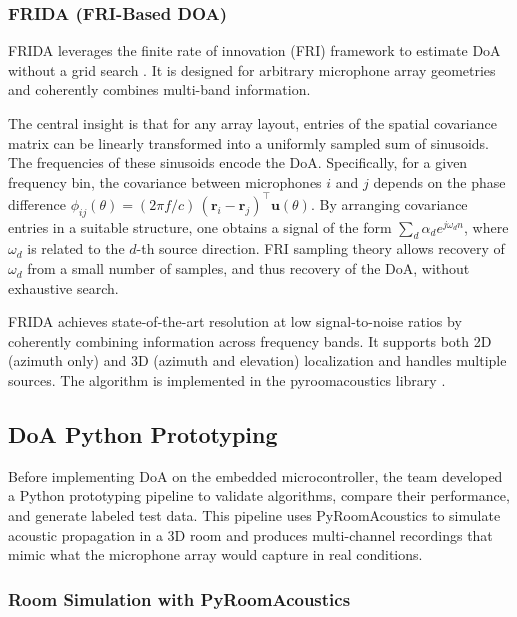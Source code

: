 \documentclass[12pt, titlepage]{article}
\begin{document}
\subsubsection{FRIDA (FRI-Based DOA)} \label{sec:frida}

FRIDA leverages the finite rate of innovation (FRI) framework to estimate DoA
without a grid search \cite{Pan2017FRIDA}. It is designed for arbitrary
microphone array geometries and coherently combines multi-band information.

The central insight is that for any array layout, entries of the spatial
covariance matrix can be linearly transformed into a uniformly sampled sum of
sinusoids. The frequencies of these sinusoids encode the DoA. Specifically,
for a given frequency bin, the covariance between microphones $i$ and $j$
depends on the phase difference $\phi_{ij}(\theta) = (2\pi f / c) \,
(\mathbf{r}_i - \mathbf{r}_j)^\top \mathbf{u}(\theta)$. By arranging covariance
entries in a suitable structure, one obtains a signal of the form $\sum_d
\alpha_d e^{j \omega_d n}$, where $\omega_d$ is related to the $d$-th source
direction. FRI sampling theory allows recovery of $\omega_d$ from a small number
of samples, and thus recovery of the DoA, without exhaustive search.

FRIDA achieves state-of-the-art resolution at low signal-to-noise ratios by
coherently combining information across frequency bands. It supports both 2D
(azimuth only) and 3D (azimuth and elevation) localization and handles multiple
sources. The algorithm is implemented in the pyroomacoustics library
\cite{pyroomacoustics}.

\subsection{DoA Python Prototyping} \label{sec:doa_prototyping}

Before implementing DoA on the embedded microcontroller, the team developed a
Python prototyping pipeline to validate algorithms, compare their performance,
and generate labeled test data. This pipeline uses PyRoomAcoustics
\cite{pyroomacoustics} to simulate acoustic propagation in a 3D room and
produces multi-channel recordings that mimic what the microphone array would
capture in real conditions.

\subsubsection{Room Simulation with PyRoomAcoustics}
\end{document}
